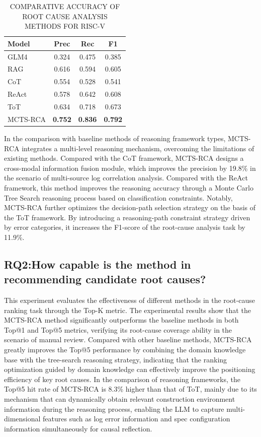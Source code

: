 \documentclass[10pt,conference]{IEEEtran}
\begin{document}
\begin{table}[htbp]
    \centering
    \caption{COMPARATIVE ACCURACY OF ROOT CAUSE ANALYSIS METHODS FOR RISC-V}
    \label{tab:accuracy_results}
    \begin{tabular}{lccc}
        \hline
        Model & Prec & Rec & F1 \\
        \hline
        GLM4 & 0.324 & 0.475 & 0.385 \\
        RAG & 0.616 & 0.594 & 0.605 \\
        CoT & 0.554 & 0.528 & 0.541 \\
        ReAct & 0.578 & 0.642 & 0.608 \\
        ToT & 0.634 & 0.718 & 0.673 \\
        MCTS-RCA & \textbf{0.752} & \textbf{0.836} & \textbf{0.792} \\
        \hline
    \end{tabular}
\end{table}

In the comparison with baseline methods of reasoning framework types, MCTS-RCA integrates a multi-level reasoning mechanism, overcoming the limitations of existing methods. Compared with the CoT framework, MCTS-RCA designs a cross-modal information fusion module, which improves the precision by 19.8\% in the scenario of multi-source log correlation analysis. Compared with the ReAct framework, this method improves the reasoning accuracy through a Monte Carlo Tree Search reasoning process based on classification constraints. Notably, MCTS-RCA further optimizes the decision-path selection strategy on the basis of the ToT framework. By introducing a reasoning-path constraint strategy driven by error categories, it increases the F1-score of the root-cause analysis task by 11.9\%.



\subsection{RQ2:How capable is the method in recommending candidate root causes?}\label{sec:rq2}
This experiment evaluates the effectiveness of different methods in the root-cause ranking task through the Top-K metric. The experimental results show that the MCTS-RCA method significantly outperforms the baseline methods in both Top@1 and Top@5 metrics, verifying its root-cause coverage ability in the scenario of manual review. Compared with other baseline methods, MCTS-RCA greatly improves the Top@5 performance by combining the domain knowledge base with the tree-search reasoning strategy, indicating that the ranking optimization guided by domain knowledge can effectively improve the positioning efficiency of key root causes. In the comparison of reasoning frameworks, the Top@5 hit rate of MCTS-RCA is 8.3\% higher than that of ToT, mainly due to its mechanism that can dynamically obtain relevant construction environment information during the reasoning process, enabling the LLM to capture multi-dimensional features such as log error information and spec configuration information simultaneously for causal reflection.
\end{document}
